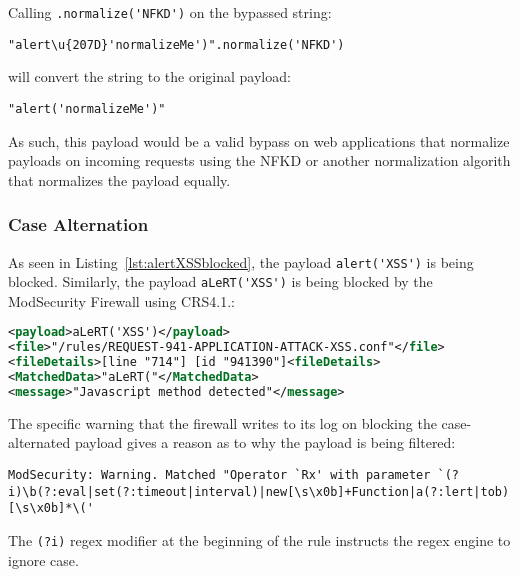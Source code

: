 Calling \verb|.normalize('NFKD')| on the bypassed string:

\begin{lstlisting}[style=basicStyle]
"alert\u{207D}'normalizeMe')".normalize('NFKD')
\end{lstlisting}

will convert the string to the original payload:

\begin{lstlisting}[style=basicStyle]
"alert('normalizeMe')"
\end{lstlisting}

As such, this payload would be a valid bypass on web applications that normalize payloads on incoming requests using the NFKD or another normalization algorith that normalizes the payload equally.


\subsubsection{Case Alternation}
\label{sec:casealternationevaluation}
As seen in Listing~\ref{lst:alertXSSblocked}, the payload \verb|alert('XSS')| is being blocked. Similarly, the payload \verb|aLeRT('XSS')| is being blocked by the ModSecurity Firewall using CRS4.1.:

\begin{lstlisting}[style=ruleStyle, language=XML, caption=alert("normalizeMe") blocked, label=lst:alertcasealternationblocked]
<payload>aLeRT('XSS')</payload>
<file>"/rules/REQUEST-941-APPLICATION-ATTACK-XSS.conf"</file>
<fileDetails>[line "714"] [id "941390"]<fileDetails>
<MatchedData>"aLeRT("</MatchedData>
<message>"Javascript method detected"</message>
\end{lstlisting}

The specific warning that the firewall writes to its log on blocking the case-alternated payload gives a reason as to why the payload is being filtered:
\begin{lstlisting}[style=basicStyle, caption=ModSecurity warning on case alternated payloads, label={lst:modsecwarning}]
	ModSecurity: Warning. Matched "Operator `Rx' with parameter `(?i)\b(?:eval|set(?:timeout|interval)|new[\s\x0b]+Function|a(?:lert|tob)|btoa|prompt|confirm)[\s\x0b]*\('
\end{lstlisting}
The \verb|(?i)| regex modifier at the beginning of the rule instructs the regex engine to ignore case.


